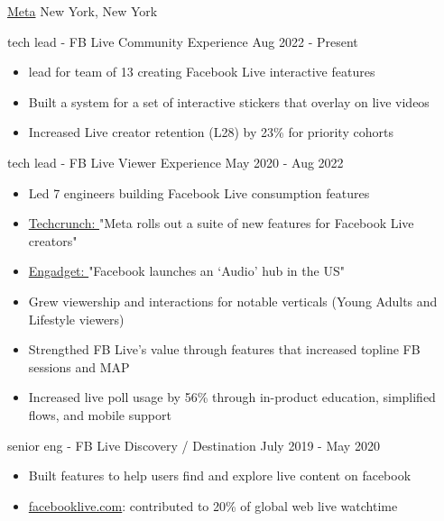 \documentclass[11pt]{article}
\begin{document}
\headedsection  %
{\href{http://www.about.fb.com/}{Meta}}
{New York, New York}
{
    \headedsubsection
    {tech lead - FB Live Community Experience}
    {Aug 2022 - Present}
    {
        \begin{itemize}
            \item lead for team of 13 creating Facebook Live interactive features
            \item Built a system for a set of interactive stickers that overlay on live videos
            \item Increased Live creator retention (L28) by 23\% for priority cohorts
        \end{itemize}

    }
    \headedsubsection
    {tech lead - FB Live Viewer Experience}
    {May 2020 - Aug 2022}
    {
        \begin{itemize}
            \item Led 7 engineers building Facebook Live consumption features
            \item 
                \href{https://techcrunch.com/2021/12/09/meta-rolls-out-a-suite-of-new-features-and-discovery-tools-for-facebook-live-creators}{Techcrunch: }
                "Meta rolls out a suite of new features for Facebook Live creators"
            \item 
                \href{https://www.engadget.com/facebook-audio-content-hub-live-audio-rooms-podcasts-170633543.html}
                {Engadget: }
                "Facebook launches an ‘Audio’ hub in the US"
            \item Grew viewership and interactions for notable verticals (Young Adults and Lifestyle viewers)
            \item Strengthed FB Live's value through features that increased topline FB sessions and MAP
            \item Increased live poll usage by 56\% through in-product education, simplified flows, and mobile support
        \end{itemize}
    }
    \headedsubsection
    {senior eng - FB Live Discovery / Destination} 
    {July 2019 - May 2020}
    {
        \begin{itemize}
            \item Built features to help users find and explore live content on facebook 
            \item {\href{http://www.facebooklive.com/}{facebooklive.com}}: contributed to 20\% of global web live watchtime
        \end{itemize}

    }
}
\end{document}
